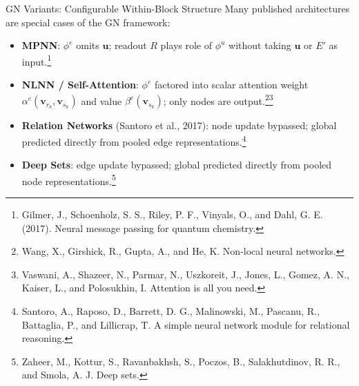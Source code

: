 \documentclass[10pt]{beamer}
\begin{document}
\begin{frame}{GN Variants: Configurable Within-Block Structure}
Many published architectures are special cases of the GN framework:

\begin{itemize}
    \item \textbf{MPNN}: $\phi^e$ omits $\mathbf{u}$; readout $R$ plays role of
    $\phi^u$ without taking $\mathbf{u}$ or $E'$ as input.\footnote{
        Gilmer, J., Schoenholz, S. S., Riley, P. F., Vinyals, O., and Dahl, G. E. (2017). Neural message passing for quantum chemistry.
    }
    \item \textbf{NLNN / Self-Attention}:
    $\phi^e$ factored into scalar attention weight $\alpha^e(\mathbf{v}_{r_k}, \mathbf{v}_{s_k})$
    and value $\beta^e(\mathbf{v}_{s_k})$; only nodes are output.\footnote{
        Wang, X., Girshick, R., Gupta, A., and He, K. Non-local neural networks.
    }\footnote{
        Vaswani, A., Shazeer, N., Parmar, N., Uszkoreit, J., Jones, L., Gomez, A. N., Kaiser, L., and Polosukhin, I. Attention is all you need. 
    }
    \item \textbf{Relation Networks} (Santoro et al., 2017): node update bypassed;
    global predicted directly from pooled edge representations.\footnote{
        Santoro, A., Raposo, D., Barrett, D. G., Malinowski, M., Pascanu, R., Battaglia, P., and Lillicrap, T. A simple neural network module for relational reasoning.
    }
    \item \textbf{Deep Sets}: edge update bypassed;
    global predicted directly from pooled node representations.\footnote{
        Zaheer, M., Kottur, S., Ravanbakhsh, S., Poczos, B., Salakhutdinov, R. R., and Smola, A. J. Deep sets. 
    }
\end{itemize}
\end{frame}
\end{document}
